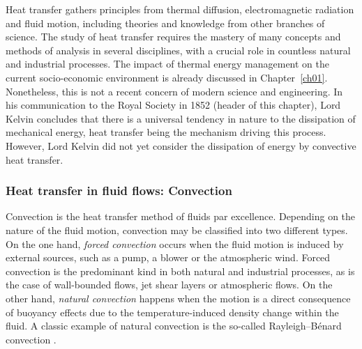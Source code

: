 Heat transfer gathers principles from thermal diffusion, electromagnetic radiation and fluid motion, including theories and knowledge from other branches of science. The study of heat transfer requires the mastery of many concepts and methods of analysis in several disciplines, with a crucial role in countless natural and industrial processes. The impact of thermal energy management on the current socio-economic environment is already discussed in Chapter~\ref{ch01}. Nonetheless, this is not a recent concern of modern science and engineering. In his communication to the Royal Society in 1852 (header of this chapter), Lord Kelvin concludes that there is a universal tendency in nature to the dissipation of mechanical energy, heat transfer being the mechanism driving this process. However, Lord Kelvin did not yet consider the dissipation of energy by convective heat transfer. 

\subsubsection*{Heat transfer in fluid flows: Convection}

Convection is the heat transfer method of fluids par excellence. Depending on the nature of the fluid motion, convection may be classified into two different types. On the one hand, \textit{forced convection} occurs when the fluid motion is induced by external sources, such as a pump, a blower or the atmospheric wind. Forced convection is the predominant kind in both natural and industrial processes, as is the case of wall-bounded flows, jet shear layers or atmospheric flows. On the other hand, \textit{natural convection} happens when the motion is a direct consequence of buoyancy effects due to the temperature-induced density change within the fluid. A classic example of natural convection is the so-called Rayleigh–Bénard convection \citep{Bodenschatz2000RBC}.

